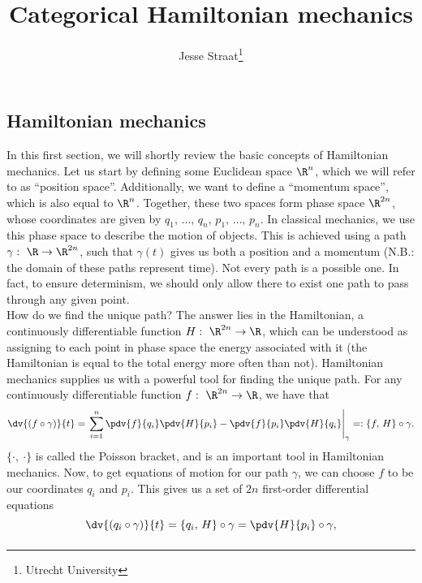 \documentclass{article}
\title{Categorical Hamiltonian mechanics}
\author{Jesse Straat\thanks{Utrecht University}}
\date{}
\begin{document}
\maketitle

\begin{multicols}{2}
	\section{Hamiltonian mechanics}
	In this first section, we will shortly review the basic concepts of Hamiltonian mechanics. Let us start by defining some Euclidean space \(\R^n\), which we will refer to as ``position space''. Additionally, we want to define a ``momentum space'', which is also equal to \(\R^n\).
	Together, these two spaces form phase space \(\R^{2n}\), whose coordinates are given by \(q_1,\,\dots,\,q_n,\,p_1,\,\dots,\,p_n\). In classical mechanics, we use this phase space to describe the motion of objects. This is achieved using a path \(\gamma:\ \R\to\R^{2n}\), such that \(\gamma(t)\) gives us both a position and a momentum (N.B.: the domain of these paths represent time).
	Not every path is a possible one. In fact, to ensure determinism, we should only allow there to exist one path to pass through any given point.\\
	How do we find the unique path? The answer lies in the Hamiltonian, a continuously differentiable function \(H:\ \R^{2n}\to\R\), which can be understood as assigning to each point in phase space the energy associated with it (the Hamiltonian is equal to the total energy more often than not).
	Hamiltonian mechanics supplies us with a powerful tool for finding the unique path. For any continuously differentiable function \(f:\ \R^{2n}\to\R\), we have that
	\begin{equation}
		\dv{(f\circ\gamma)}{t} = \left.\sum_{i=1}^n \pdv{f}{q_i}\pdv{H}{p_i} - \pdv{f}{p_i}\pdv{H}{q_i}\right|_{\gamma} =: \{f,\,H\}\circ\gamma.
	\end{equation}
	\(\{\cdot,\ \cdot\}\) is called the Poisson bracket, and is an important tool in Hamiltonian mechanics.
	Now, to get equations of motion for our path \(\gamma\), we can choose \(f\) to be our coordinates \(q_i\) and \(p_i\). This gives us a set of \(2n\) first-order differential equations
	\begin{equation}
		\dv{(q_i\circ\gamma)}{t} = \{q_i,\,H\}\circ\gamma = \pdv{H}{p_i}\circ\gamma,
	\end{equation}
	\begin{equation}

\end{equation}
\end{multicols}
\end{document}
